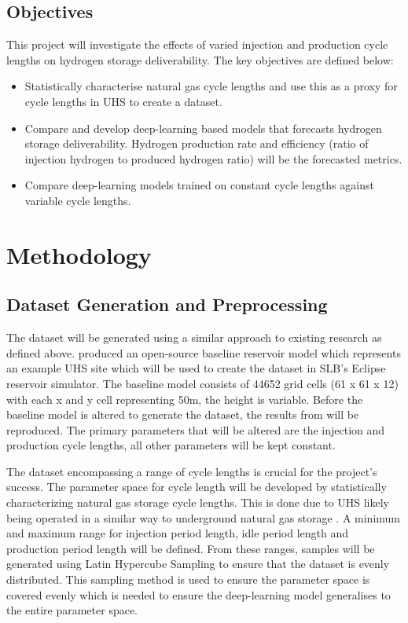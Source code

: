 \documentclass[12pt]{article}
\begin{document}
\subsection{Objectives}
This project will investigate the effects of varied injection and production cycle lengths on hydrogen storage deliverability. The key objectives are defined below:
\begin{itemize}
    \item Statistically characterise natural gas cycle lengths and use this as a proxy for cycle lengths in UHS to create a dataset. 
    \item Compare and develop deep-learning based models that forecasts hydrogen storage deliverability. Hydrogen production rate and efficiency (ratio of injection hydrogen to produced hydrogen ratio) will be the forecasted metrics. 
    \item Compare deep-learning models trained on constant cycle lengths against variable cycle lengths.
\end{itemize}

\FloatBarrier

\section{Methodology}
\subsection{Dataset Generation and Preprocessing}
The dataset will be generated using a similar approach to existing research as defined above. \citet{hogeweg2022benchmark} produced an open-source baseline reservoir model which represents an example UHS site which will be used to create the dataset in SLB's Eclipse reservoir simulator. The baseline model consists of 44652 grid cells (61 x 61 x 12) with each x and y cell representing 50m, the height is variable. Before the baseline model is altered to generate the dataset, the results from \citet{hogeweg2022benchmark} will be reproduced. The primary parameters that will be altered are the injection and production cycle lengths, all other parameters will be kept constant. 

The dataset encompassing a range of cycle lengths is crucial for the project's success. The parameter space for cycle length will be developed by statistically characterizing natural gas storage cycle lengths. This is done due to UHS likely being operated in a similar way to underground natural gas storage \cite{tarkowski2019underground}. A minimum and maximum range for injection period length, idle period length and production period length will be defined. From these ranges, samples will be generated using Latin Hypercube Sampling to ensure that the dataset is evenly distributed. This sampling method is used to ensure the parameter space is covered evenly which is needed to ensure the deep-learning model generalises to the entire parameter space. 
\end{document}
